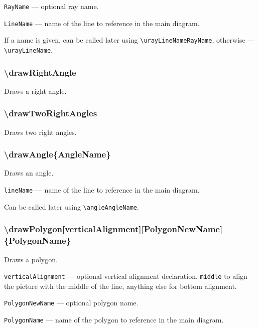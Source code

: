 \documentclass{ltxdoc}
\begin{document}
	\texttt{RayName} — optional ray name.
	
	\texttt{LineName} — name of the line to reference in the main diagram. 

	If a name is given, can be called later using \texttt{\textbackslash urayLineNameRayName}, otherwise — \texttt{\textbackslash urayLineName}. 
	




\subsubsection{\textbackslash drawRightAngle}

	Draws a right angle.

\subsubsection{\textbackslash drawTwoRightAngles}

	Draws two right angles.


\subsubsection{\textbackslash drawAngle\{AngleName\}}

	Draws an angle.

	\texttt{lineName} — name of the line to reference in the main diagram. 
	
	Can be called later using \texttt{\textbackslash angleAngleName}.
	
	
\subsubsection{\textbackslash drawPolygon[verticalAlignment][PolygonNewName]\{PolygonName\}}

	Draws a polygon.

	\texttt{verticalAlignment} — optional vertical alignment declaration. \texttt{middle} to align the picture with the middle of the line, anything else for bottom alignment.

	\texttt{PolygonNewName} — optional polygon name. 
	
	\texttt{PolygonName} — name of the polygon to reference in the main diagram. 
	
\end{document}
